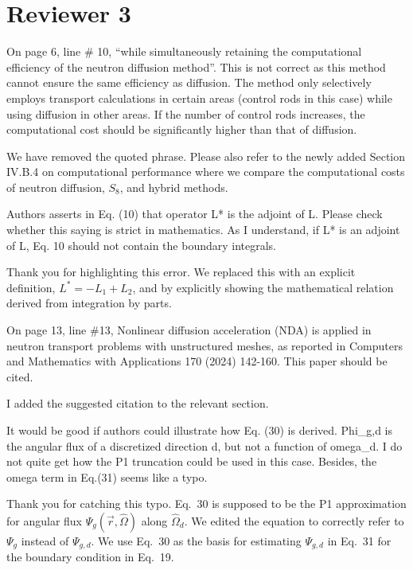 \documentclass[answers,11pt]{exam}
\begin{document}
\section*{Reviewer 3}
\begin{questions}

    \question On page 6, line \# 10, ``while simultaneously retaining the computational efficiency of the neutron diffusion method''. This is not correct as this method cannot ensure the same efficiency as diffusion. The method only selectively employs transport calculations in certain areas (control rods in this case) while using diffusion in other areas. If the number of control rods increases, the computational cost should be significantly higher than that of diffusion.
    \begin{solution}
        We have removed the quoted phrase. Please also refer to the newly added Section IV.B.4 on
        computational performance where we compare the computational costs of neutron diffusion,
        $S_8$, and hybrid methods.
    \end{solution}

    \question Authors asserts in Eq. (10) that operator L* is the adjoint of L. Please check whether this saying is strict in mathematics. As I understand, if L* is an adjoint of L, Eq. 10 should not contain the boundary integrals.
    \begin{solution}
        Thank you for highlighting this error. We replaced this with an explicit definition,
        $L^*=-L_1+L_2$, and by explicitly showing the mathematical relation derived from
        integration by parts.
    \end{solution}

    \question On page 13, line \#13, Nonlinear diffusion acceleration (NDA) is applied in neutron transport problems with unstructured meshes, as reported in Computers and Mathematics with Applications 170 (2024) 142-160. This paper should be cited.
    \begin{solution}
        I added the suggested citation to the relevant section.
    \end{solution}

    \question It would be good if authors could illustrate how Eq. (30) is derived. Phi\_g,d is the angular flux of a discretized direction d, but not a function of omega\_d. I do not quite get how the P1 truncation could be used in this case. Besides, the omega term in Eq.(31) seems like a typo.
    \begin{solution}
        Thank you for catching this typo. Eq.\ 30 is supposed to be the P1 approximation for
        angular flux $\Psi_g(\vec{r},\hat{\Omega})$ along $\hat{\Omega}_d$. We edited the equation
        to correctly refer to $\Psi_g$ instead of $\Psi_{g,d}$. We use Eq.\ 30 as the basis for
        estimating $\Psi_{g,d}$ in Eq.\ 31 for the boundary condition in Eq.\ 19.
    \end{solution}


\end{questions}
\end{document}
